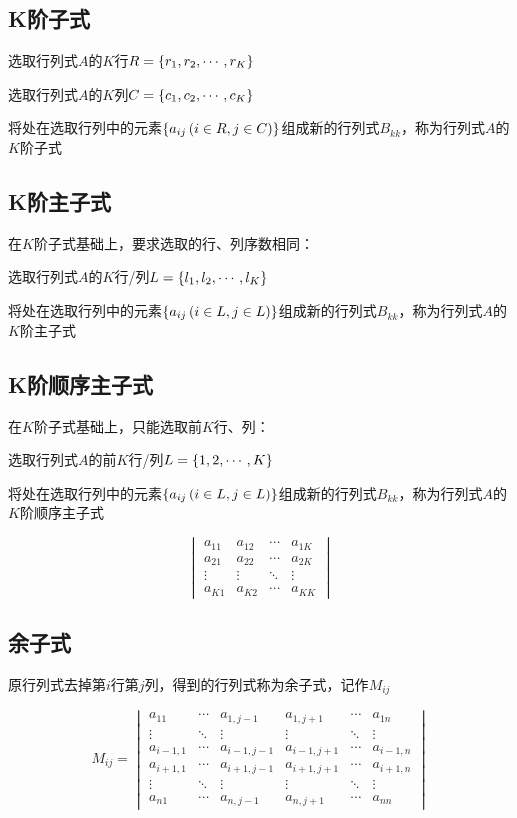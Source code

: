 \documentclass{article}
\begin{document}
\subsection{K阶子式}

选取行列式$A$的$K$行$R=\left\{r_1,r_2,\cdots,r_K\right\}$

选取行列式$A$的$K$列$C=\left\{c_1,c_2,\cdots,c_K\right\}$

将处在选取行列中的元素$\left\{a_{ij}\left(i\in R,j\in C\right)\right\}$组成新的行列式$B_{kk}$，称为行列式$A$的$K$阶子式

\subsection{K阶主子式}

在$K$阶子式基础上，要求选取的行、列序数相同：

选取行列式$A$的$K$行/列$L=\left\{l_1,l_2,\cdots,l_K\right\}$

将处在选取行列中的元素$\left\{a_{ij}\left(i\in L,j\in L\right)\right\}$组成新的行列式$B_{kk}$，称为行列式$A$的$K$阶主子式

\subsection{K阶顺序主子式}

在$K$阶子式基础上，只能选取前$K$行、列：

选取行列式$A$的前$K$行/列$L=\left\{1,2,\cdots,K\right\}$

将处在选取行列中的元素$\left\{a_{ij}\left(i\in L,j\in L\right)\right\}$组成新的行列式$B_{kk}$，称为行列式$A$的$K$阶顺序主子式

\[\begin{vmatrix}
        a_{11} & a_{12} & \cdots & a_{1K} \\
        a_{21} & a_{22} & \cdots & a_{2K} \\
        \vdots & \vdots & \ddots & \vdots \\
        a_{K1} & a_{K2} & \cdots & a_{KK}
    \end{vmatrix}\]

\subsection{余子式}

原行列式去掉第$i$行第$j$列，得到的行列式称为余子式，记作$M_{ij}$

\[M_{ij}=\begin{vmatrix}
        a_{11}    & \cdots & a_{1,j-1}   & a_{1,j+1}   & \cdots & a_{1n}    \\
        \vdots    & \ddots & \vdots      & \vdots      & \ddots & \vdots    \\
        a_{i-1,1} & \cdots & a_{i-1,j-1} & a_{i-1,j+1} & \cdots & a_{i-1,n} \\
        a_{i+1,1} & \cdots & a_{i+1,j-1} & a_{i+1,j+1} & \cdots & a_{i+1,n} \\
        \vdots    & \ddots & \vdots      & \vdots      & \ddots & \vdots    \\
        a_{n1}    & \cdots & a_{n,j-1}   & a_{n,j+1}   & \cdots & a_{nn}
    \end{vmatrix}\]
\end{document}
